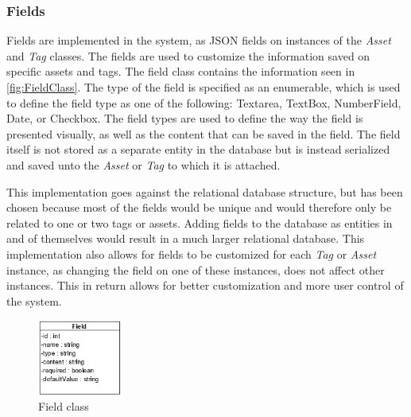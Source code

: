 \subsubsection{Fields}
Fields are implemented in the system, as JSON fields on instances of the \textit{Asset} and \textit{Tag} classes. The fields are used to customize the information saved on specific assets and tags. The field class contains the information seen in \autoref{fig:FieldClass}. The type of the field is specified as an enumerable, which is used to define the field type as one of the following: Textarea, TextBox, NumberField, Date, or Checkbox. The field types are used to define the way the field is presented visually, as well as the content that can be saved in the field. The field itself is not stored as a separate entity in the database but is instead serialized and saved unto the \textit{Asset} or \textit{Tag} to which it is attached.
\par
This implementation goes against the relational database structure, but has been chosen because most of the fields would be unique and would therefore only be related to one or two tags or assets. Adding fields to the database as entities in and of themselves would result in a much larger relational database. This implementation also allows for fields to be customized for each \textit{Tag} or \textit{Asset} instance, as changing the field on one of these instances, does not affect other instances. This in return allows for better customization and more user control of the system.

\begin{figure}[H]
    \centering
    \includegraphics[width=0.25\textwidth]{figures/Classes/FieldAttributes.png}
    \caption{Field class}
    \label{fig:FieldClass}
\end{figure}